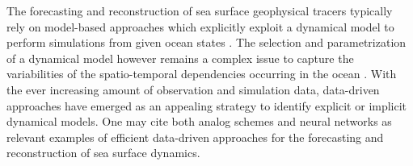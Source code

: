 \documentclass{article}
\begin{document}

The forecasting and reconstruction of sea surface geophysical tracers typically rely on model-based approaches which explicitly exploit a dynamical model to perform simulations from given ocean states \cite{gordon_simulation_2000}. The selection and parametrization of a dynamical model however remains a complex issue to capture the variabilities of the spatio-temporal dependencies occurring in the ocean \cite{lorenz_atmospheric_1982}. With the ever increasing amount of observation and simulation data, data-driven approaches have emerged as an appealing strategy to identify explicit or implicit dynamical models. One may cite both analog schemes \cite{lguensat_analog_2017} and neural networks \cite{braakmann-folgmann_sea_2017} as relevant examples of efficient data-driven approaches for the forecasting and reconstruction of sea surface dynamics. 


\end{document}
